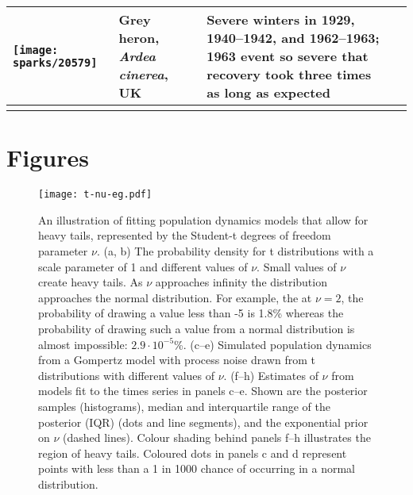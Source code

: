 \documentclass[11pt]{article}
\begin{document}
\begin{small}
\begin{longtable}{>{\RaggedRight}m{2.0cm}>{\RaggedRight}p{3.0cm}>{\RaggedRight}p{7.0cm}>{\RaggedRight}p{2.0cm}}
\texttt{[image: sparks/20579]} &
Grey heron,
\textit{Ardea cinerea},
UK &
Severe winters in 1929, 1940--1942, and 1962--1963; 1963 event so severe that recovery took three times as long as expected &
\citep{stafford1971} \\





\bottomrule
\label{tab:sparks}
\end{longtable}
\end{small}


\clearpage

\section{Figures}

\begin{figure}[htbp]
\begin{center}
\texttt{[image: t-nu-eg.pdf]}
\caption{An illustration of fitting population dynamics models that allow for heavy tails, represented by the Student-t degrees of freedom parameter $\nu$.
  (a, b) The probability density for t distributions with a scale parameter of 1 and different values of $\nu$.
  Small values of $\nu$ create heavy tails.
  As $\nu$ approaches infinity the distribution approaches the normal distribution.
  For example, the at $\nu = 2$, the probability of drawing a value less than -5 is 1.8\% whereas the probability of drawing such a value from a normal distribution is almost impossible: $2.9\cdot10^{-5}$\%.
  (c--e) Simulated population dynamics from a Gompertz model with process noise drawn from t distributions with different values of $\nu$.
  (f--h) Estimates of $\nu$ from models fit to the times series in panels c--e.
  Shown are the posterior samples (histograms), median and interquartile range of the posterior (IQR) (dots and line segments), and the exponential prior on $\nu$ (dashed lines).
  Colour shading behind panels f--h illustrates the region of heavy tails.
  Coloured dots in panels c and d represent points with less than a 1 in 1000 chance of occurring in a normal distribution.}
\label{fig:didactic}
\end{center}
\end{figure}
\end{document}
